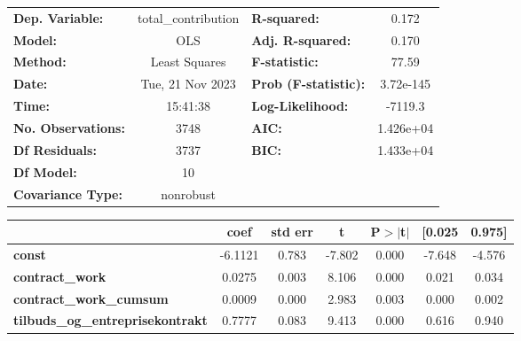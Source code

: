 \begin{center}
\begin{tabular}{lclc}
\toprule
\textbf{Dep. Variable:}                   & total\_contribution & \textbf{  R-squared:         } &     0.172   \\
\textbf{Model:}                           &         OLS         & \textbf{  Adj. R-squared:    } &     0.170   \\
\textbf{Method:}                          &    Least Squares    & \textbf{  F-statistic:       } &     77.59   \\
\textbf{Date:}                            &   Tue, 21 Nov 2023  & \textbf{  Prob (F-statistic):} & 3.72e-145   \\
\textbf{Time:}                            &       15:41:38      & \textbf{  Log-Likelihood:    } &   -7119.3   \\
\textbf{No. Observations:}                &          3748       & \textbf{  AIC:               } & 1.426e+04   \\
\textbf{Df Residuals:}                    &          3737       & \textbf{  BIC:               } & 1.433e+04   \\
\textbf{Df Model:}                        &            10       & \textbf{                     } &             \\
\textbf{Covariance Type:}                 &      nonrobust      & \textbf{                     } &             \\
\bottomrule
\end{tabular}
\begin{tabular}{lcccccc}
                                          & \textbf{coef} & \textbf{std err} & \textbf{t} & \textbf{P$> |$t$|$} & \textbf{[0.025} & \textbf{0.975]}  \\
\midrule
\textbf{const}                            &      -6.1121  &        0.783     &    -7.802  &         0.000        &       -7.648    &       -4.576     \\
\textbf{contract\_work}                   &       0.0275  &        0.003     &     8.106  &         0.000        &        0.021    &        0.034     \\
\textbf{contract\_work\_cumsum}           &       0.0009  &        0.000     &     2.983  &         0.003        &        0.000    &        0.002     \\
\textbf{tilbuds\_og\_entreprisekontrakt}  &       0.7777  &        0.083     &     9.413  &         0.000        &        0.616    &        0.940     \\

\end{tabular}
\end{center}
